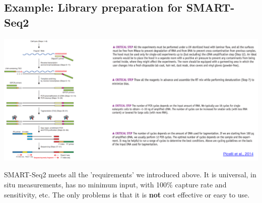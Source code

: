 \documentclass[10pt]{article}
\begin{document}
\subsection*{Example: Library preparation for SMART-Seq2}
\begin{center}
    \includegraphics*[scale=1]{W7_2.png}
\end{center}
SMART-Seq2 meets all the 'requirements' we introduced above.  It is universal, in situ measurements, has no minimum input, with 100\% capture rate and sensitivity, etc.  The only problems is that it is \textbf{not} cost effective or easy to use.
\end{document}
